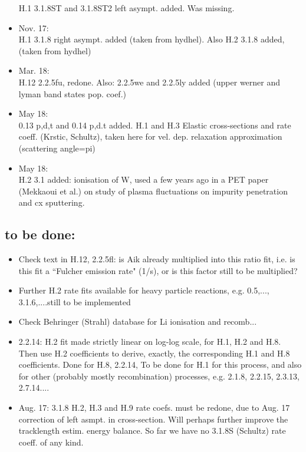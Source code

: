 \documentclass[12pt,dvipdfmx]{article}
\begin{document}
\begin{itemize}
H.1  3.1.8ST  and 3.1.8ST2  left asympt. added. Was missing.
\item Nov. 17: \\
H.1  3.1.8 right asympt. added (taken from hydhel). Also H.2  3.1.8 added, (taken from hydhel)
\item Mar. 18: \\
H.12  2.2.5fu, redone. Also: 2.2.5we and 2.2.5ly added (upper werner and lyman band
states pop. coef.)
\item May 18: \\
0.13 p,d,t and 0.14 p,d.t added. H.1 and H.3 Elastic cross-sections and rate coeff.
(Krstic, Schultz), taken here for vel. dep. relaxation approximation (scattering angle=pi)
\item May 18: \\
H.2  3.1 added: ionisation of W, used a few years ago in a PET paper (Mekkaoui et al.)
on study of plasma
fluctuations on impurity penetration and cx sputtering.
\end{itemize}

\subsection{to be done:}
\begin{itemize}
\item  Check text in H.12, 2.2.5fl:  is Aik already multiplied into this ratio fit, i.e. is
this fit a ``Fulcher emission rate" (1/s), or is this factor still to be multiplied?
\item  Further H.2 rate fits available for heavy particle reactions, e.g. 0.5,..., 3.1.6,....still to be implemented
\item  Check Behringer (Strahl) database for Li ionisation and recomb...
\item 2.2.14: H.2 fit made strictly linear on log-log scale, for H.1, H.2 and H.8. Then use H.2 coefficients to
derive, exactly, the corresponding H.1 and H.8 coefficients. Done for H.8, 2.2.14,  To be done for H.1 for this
process,
and also for other (probably mostly recombination) processes, e.g. 2.1.8, 2.2.15, 2.3.13, 2.7.14....
\item  Aug. 17:   3.1.8  H.2, H.3 and H.9 rate coefs. must be redone, due to Aug. 17 correction of left asmpt. in cross-section.
Will perhaps further improve the tracklength estim. energy balance.
So far we have no 3.1.8S (Schultz) rate coeff. of any kind.
\end{itemize}
\end{document}
